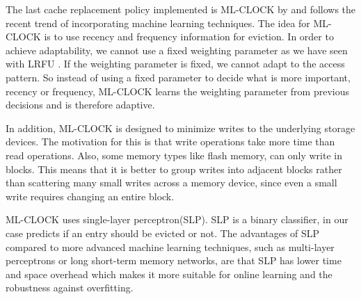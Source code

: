 \documentclass[
	12pt,
	a4paper,
	abstract,
	bibliography=totoc,
	chapterprefix,
	headings=openright,
	numbers=endperiod,
	parskip=half,
	twoside,
]{scrreprt}
\begin{document}
%
%
%

The last cache replacement policy implemented is ML-CLOCK by \cite{cho2021ml} and 
follows the recent trend of incorporating machine learning techniques.
The idea for ML-CLOCK is to use recency and frequency information for eviction.
In order to achieve adaptability, we cannot use a fixed weighting parameter as we have seen with LRFU \cite{lee2001lrfu}. 
If the weighting parameter is fixed, we cannot adapt to the access pattern.
So instead of using a fixed parameter to decide what is more important, recency 
or frequency,
ML-CLOCK learns the weighting parameter from previous decisions and is therefore adaptive.

In addition, ML-CLOCK is designed to minimize writes to the underlying storage devices.
The motivation for this is that write operations take more time than read operations.
Also, some memory types like flash memory, can only write in blocks.
This means that it is better to group writes into adjacent blocks rather than scattering many small writes across a memory device, since even a small write requires changing an entire block.

ML-CLOCK uses single-layer perceptron(SLP).
SLP is a binary classifier, in our case predicts if an entry should be evicted or 
not.
The advantages of SLP compared to more advanced machine learning techniques, such 
as multi-layer perceptrons or long short-term memory networks, are that
SLP has lower time and space overhead which makes it more suitable for online  
learning and the robustness against overfitting.  
\end{document}
